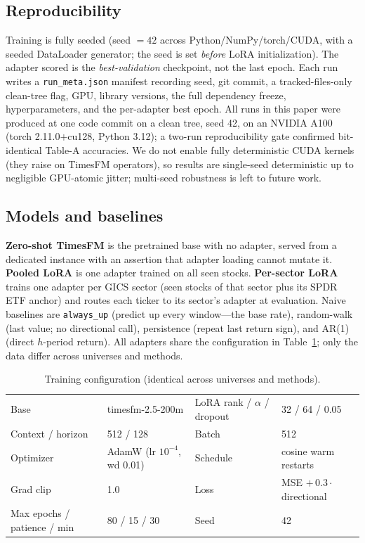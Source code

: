 \documentclass[11pt]{article}
\newcommand{\alwaysup}{\texttt{always\_up}}
\begin{document}
\subsection{Reproducibility}
Training is fully seeded (seed $=42$ across Python/NumPy/torch/CUDA, with a seeded
DataLoader generator; the seed is set \emph{before} LoRA initialization). The adapter
scored is the \emph{best-validation} checkpoint, not the last epoch. Each run writes a
\texttt{run\_meta.json} manifest recording seed, git commit, a tracked-files-only
clean-tree flag, GPU, library versions, the full dependency freeze, hyperparameters,
and the per-adapter best epoch. All runs in this paper were produced at one code commit
on a clean tree, seed 42, on an NVIDIA A100 (torch 2.11.0$+$cu128, Python 3.12); a
two-run reproducibility gate confirmed bit-identical Table-A accuracies. We do not
enable fully deterministic CUDA kernels (they raise on TimesFM operators), so results
are single-seed deterministic up to negligible GPU-atomic jitter; multi-seed robustness
is left to future work.

\subsection{Models and baselines}
\textbf{Zero-shot TimesFM} is the pretrained base with no adapter, served from a
dedicated instance with an assertion that adapter loading cannot mutate it.
\textbf{Pooled LoRA} is one adapter trained on all seen stocks. \textbf{Per-sector
LoRA} trains one adapter per GICS sector (seen stocks of that sector plus its SPDR ETF
anchor) and routes each ticker to its sector's adapter at evaluation. Naive baselines
are \alwaysup{} (predict up every window---the base rate), random-walk (last value; no
directional call), persistence (repeat last return sign), and AR(1) (direct $h$-period
return). All adapters share the configuration in Table~\ref{tab:hp}; only the data
differ across universes and methods.

\begin{table}[H]
\centering
\caption{Training configuration (identical across universes and methods).}
\label{tab:hp}
\begin{tabular}{llll}
\toprule
Base & timesfm-2.5-200m & LoRA rank / $\alpha$ / dropout & 32 / 64 / 0.05 \\
Context / horizon & 512 / 128 & Batch & 512 \\
Optimizer & AdamW (lr $10^{-4}$, wd 0.01) & Schedule & cosine warm restarts \\
Grad clip & 1.0 & Loss & MSE $+\,0.3\cdot$directional \\
Max epochs / patience / min & 80 / 15 / 30 & Seed & 42 \\
\bottomrule
\end{tabular}
\end{table}
\end{document}
